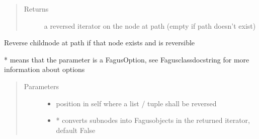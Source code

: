 \documentclass[a4paper,10pt,english]{sphinxmanual}
\begin{document}
\begin{fulllineitems}
\begin{fulllineitems}
\begin{quote}
\begin{description}
\begin{itemize}
\end{itemize}

\item[{Returns}] \leavevmode
\sphinxAtStartPar
a reversed iterator on the node at path (empty if path doesn’t exist)

\end{description}\end{quote}

\end{fulllineitems}


\begin{fulllineitems}
\label{\detokenize{fagus.fagus:fagus.fagus.Fagus.reverse}}
\pysigstartsignatures
{}
\pysigstopsignatures
\sphinxAtStartPar
Reverse child\sphinxhyphen{}node at path if that node exists and is reversible

\sphinxAtStartPar
* means that the parameter is a FagusOption, see Fagus\sphinxhyphen{}class\sphinxhyphen{}docstring for more information about options
\begin{quote}\begin{description}
\item[{Parameters}] \leavevmode\begin{itemize}
\item {}
\sphinxAtStartPar
{} \textendash{} position in self where a list / tuple shall be reversed

\item {}
\sphinxAtStartPar
{} \textendash{} * converts sub\sphinxhyphen{}nodes into Fagus\sphinxhyphen{}objects in the returned iterator, default False


\end{itemize}
\end{description}
\end{quote}
\end{fulllineitems}
\end{fulllineitems}
\end{document}

